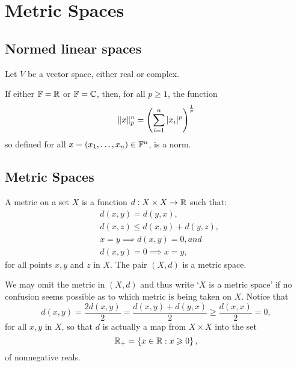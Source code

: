 \chapter{Metric Spaces}\label{chp:metric-spaces}

\section{Normed linear spaces}

\begin{definition}\label{def:normed-linear-spaces}
  Let \(V\) be a vector space, either real or complex.
\end{definition}

If either \(\mathbb{F}=\mathbb{R}\) or \(\mathbb{F}=\mathbb{C}\), then, for
all \(p\geqslant{1}\), the function
\[
  \norm<n>(p)[x]=\left(\sum_{i=1}^{n}\,\abs{x_{i}}^{p}\right)^{\frac{1}{p}}
\]
so defined for all \(x=(x_{1},\ldots,x_{n})\in\mathbb{F}^{n}\), is a norm.

\section{Metric Spaces}\label{sec:metric-spaces}

\begin{definition}
  A metric on a set \(X\) is a function \(d:X\times{X}\to\mathbb{R}\) such that:
  \begin{align}
      & d(x,y)=d(y,x),                  \label{axiom:metric-space-01} \\
      & d(x,z)\leqslant{d(x,y)+d(y,z)}, \label{axiom:metric-space-02} \\
      & x=y\implies{d(x,y)=0}, and      \label{axiom:metric-space-03} \\
      & d(x,y)=0\implies{x=y},          \label{axiom:metric-space-04}
  \end{align}
  for all points \(x,y\) and \(z\) in \(X\). The pair \((X,d)\) is a metric
  space.
\end{definition}

We may omit the metric in \((X,d)\) and thus write `\(X\) is a metric space' if
no confusion seems possible as to which metric is being taken on \(X\). Notice
that
\[
  d(x,y)
  =
  \frac{2d(x,y)}{2}
  =
  \frac{d(x,y)+d(y,x)}{2}
  \geqslant
  \frac{d(x,x)}{2}
  =
  0,
\]
for all \(x,y\) in \(X\), so that \(d\) is actually a map from \(X\times{X}\)
into the set
\[
  \mathbb{R}_{+}
  =
  \left\{x\in\mathbb{R}:x\geqslant{0}\right\},
\]
of nonnegative reals.

